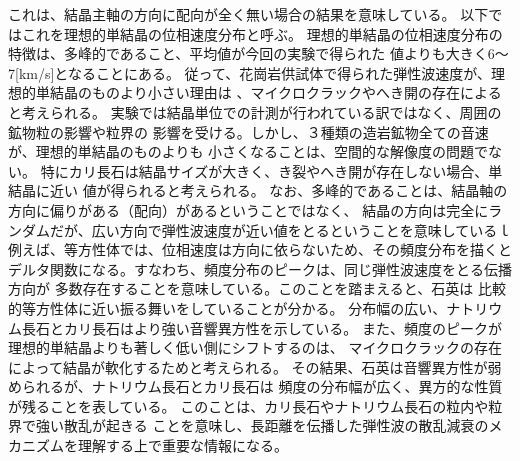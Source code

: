 これは、結晶主軸の方向に配向が全く無い場合の結果を意味している。
以下ではこれを理想的単結晶の位相速度分布と呼ぶ。
理想的単結晶の位相速度分布の特徴は、多峰的であること、平均値が今回の実験で得られた
値よりも大きく6〜7[km/s]となることにある。
従って、花崗岩供試体で得られた弾性波速度が、理想的単結晶のものより小さい理由は
、マイクロクラックやへき開の存在によると考えられる。
実験では結晶単位での計測が行われている訳ではなく、周囲の鉱物粒の影響や粒界の
影響を受ける。しかし、３種類の造岩鉱物全ての音速が、理想的単結晶のものよりも
小さくなることは、空間的な解像度の問題でない。
特にカリ長石は結晶サイズが大きく、き裂やへき開が存在しない場合、単結晶に近い
値が得られると考えられる。
なお、多峰的であることは、結晶軸の方向に偏りがある（配向）があるということではなく、
結晶の方向は完全にランダムだが、広い方向で弾性波速度が近い値をとるということを意味しているｌ
例えば、等方性体では、位相速度は方向に依らないため、その頻度分布を描くと
デルタ関数になる。すなわち、頻度分布のピークは、同じ弾性波速度をとる伝播方向が
多数存在することを意味している。このことを踏まえると、石英は
比較的等方性体に近い振る舞いをしていることが分かる。
分布幅の広い、ナトリウム長石とカリ長石はより強い音響異方性を示している。
また、頻度のピークが理想的単結晶よりも著しく低い側にシフトするのは、
マイクロクラックの存在によって結晶が軟化するためと考えられる。
その結果、石英は音響異方性が弱められるが、ナトリウム長石とカリ長石は
頻度の分布幅が広く、異方的な性質が残ることを表している。
このことは、カリ長石やナトリウム長石の粒内や粒界で強い散乱が起きる
ことを意味し、長距離を伝播した弾性波の散乱減衰のメカニズムを理解する上で重要な情報になる。
%
%
%


